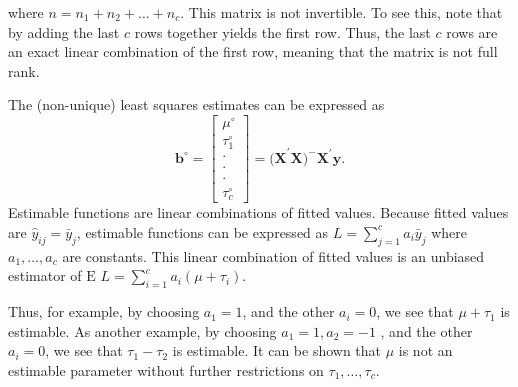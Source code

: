 \noindent where $n=n_1+n_2+\ldots+n_{c}$. This matrix is not
invertible. To see this, note that by adding the last $c$ rows
together yields the first row. Thus, the last $c$ rows are an exact
linear combination of the first row, meaning that the matrix is not
full rank.

The (non-unique) least squares estimates can be expressed as
\begin{equation*}
\mathbf{b}^{\circ }=%
\begin{bmatrix}
\mu ^{\circ } \\
\tau_1^{\circ } \\
\cdot  \\
\cdot  \\
\cdot  \\
\tau_c^{\circ }%
\end{bmatrix}%
=\mathbf{(X}^{\prime}\mathbf{X)}^{-}\mathbf{X}^{\prime}\mathbf{y.}
\end{equation*}
Estimable functions are linear combinations of fitted values.
Because fitted values are $\hat{y}_{ij}=\bar{y}_j$, estimable
functions can be expressed as $ L=\sum_{j=1}^{c}a_i\bar{y}_j $ where
$a_1,\ldots,a_{c}$ are constants. This linear combination of fitted
values is an unbiased estimator of $\text{E }L=\sum_{i=1}^{c}a_i(\mu
+\tau_i). $

Thus, for example, by choosing $a_1=1$, and the other $a_i=0$, we
see that $\mu
+\tau_1$ is estimable. As another example, by choosing $a_1=1,a_2=-1$%
, and the other $a_i=0$, we see that $\tau_1-\tau_2$ is estimable.
It can be shown that $\mu $ is not an estimable parameter without
further restrictions on $\tau_1,\ldots,\tau_c$.


